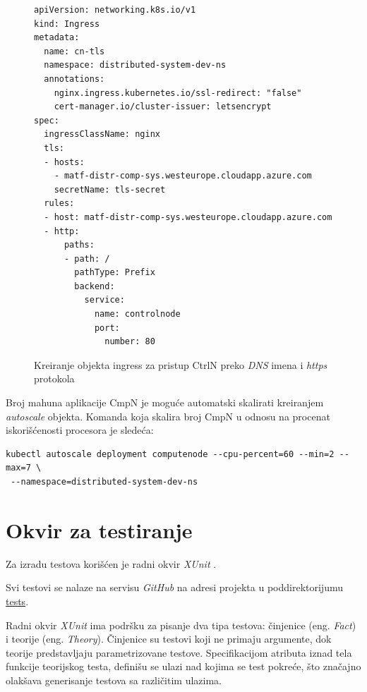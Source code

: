 \documentclass[12pt,oneside]{memoir}
\begin{document}
\begin{figure}[h!]
\centering
\begin{lstlisting}[style=yaml]
apiVersion: networking.k8s.io/v1
kind: Ingress
metadata:
  name: cn-tls
  namespace: distributed-system-dev-ns
  annotations:
    nginx.ingress.kubernetes.io/ssl-redirect: "false"
    cert-manager.io/cluster-issuer: letsencrypt
spec:
  ingressClassName: nginx
  tls:
  - hosts:
    - matf-distr-comp-sys.westeurope.cloudapp.azure.com
    secretName: tls-secret
  rules:
  - host: matf-distr-comp-sys.westeurope.cloudapp.azure.com
  - http:
      paths:
      - path: /
        pathType: Prefix
        backend:
          service:
            name: controlnode
            port:
              number: 80
\end{lstlisting}
\caption{Kreiranje objekta ingress za pristup CtrlN preko \emph{DNS} imena i \emph{https} protokola}
\label{fig:controlnode_ingress_yaml}
\end{figure}

Broj mahuna aplikacije CmpN je moguće automatski skalirati kreiranjem \emph{autoscale} objekta. Komanda koja skalira broj CmpN u odnosu na procenat iskorišćenosti procesora je sledeća:

\begin{verbatim}
kubectl autoscale deployment computenode --cpu-percent=60 --min=2 --max=7 \
 --namespace=distributed-system-dev-ns
\end{verbatim}

\section{Okvir za testiranje}
\label{sec:testiranjesistema}

Za izradu testova korišćen je radni okvir \emph{XUnit} \cite{XUnit}.

Svi testovi se nalaze na servisu \emph{GitHub} na adresi projekta u poddirektorijumu \href{https://github.com/milana-kovacevic/DistributedComputationSystem/tree/main/tests}{tests}.

Radni okvir \emph{XUnit} ima podršku za pisanje dva tipa testova: činjenice (eng. \emph{Fact}) i teorije (eng. \emph{Theory}). Činjenice su testovi koji ne primaju argumente, dok teorije predstavljaju parametrizovane testove. Specifikacijom atributa iznad tela funkcije teorijskog testa, definišu se ulazi nad kojima se test pokreće, što značajno olakšava generisanje testova sa različitim ulazima.
\end{document}

